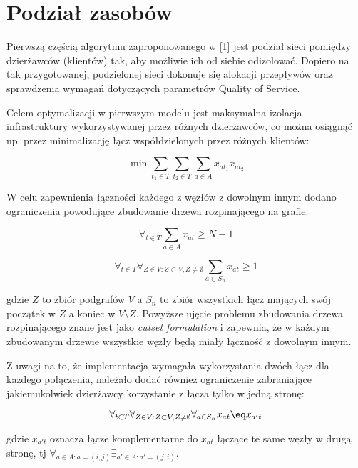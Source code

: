 \section{Podział zasobów}

Pierwszą częścią algorytmu zaproponowanego w [1] jest podział sieci pomiędzy dzierżawców (klientów) tak, aby możliwie ich od siebie odizolować. Dopiero na tak przygotowanej, podzielonej sieci dokonuje się alokacji przepływów oraz sprawdzenia wymagań dotyczących parametrów Quality of Service. \newline

Celem optymalizacji w pierwszym modelu jest maksymalna izolacja infrastruktury wykorzystywanej przez różnych dzierżawców, co można osiągnąć np. przez minimalizację łącz współdzielonych przez różnych klientów:

\begin{equation}
  \min \sum_{t_{1} \in T} \sum_{t_{2} \in T} \sum_{a \in A} x_{at_{1}} x_{at_{2}}
\end{equation}

W celu zapewnienia łączności każdego z węzłów z dowolnym innym dodano ograniczenia powodujące zbudowanie drzewa rozpinającego na grafie:

\begin{equation}
  \forall_{t \in T} \sum_{a \in A} x_{at} \ge N-1
\end{equation}

\begin{equation}
  \forall_{t \in T} \forall_{Z \in V: Z \subset V, Z \neq \emptyset } \sum_{a \in S_{n}} x_{at} \ge 1
\end{equation}

gdzie $Z$ to zbiór podgrafów $V$ a $S_{n}$ to zbiór wszystkich łącz mających swój początek w $Z$ a koniec w $V \setminus Z$. Powyższe ujęcie problemu zbudowania drzewa rozpinającego znane jest jako \textit{cutset formulation} i zapewnia, że w każdym zbudowanym drzewie wszystkie węzły będą miały łączność z dowolnym innym.

Z uwagi na to, że implementacja wymagała wykorzystania dwóch łącz dla każdego połączenia, należało dodać również ograniczenie zabraniające jakiemukolwiek dzierżawcy korzystanie z łącza tylko w jedną stronę:

\begin{equation}
  \forall_{t \in T} \forall_{Z \in V: Z \subset V, Z \neq \emptyset } \forall_{a \in S_{n}} x_{at} \eq x_{a't}
\end{equation}

gdzie $x_{a't}$ oznacza łącze komplementarne do $x_{at}$ łączące te same węzły w drugą stronę, tj $\forall_{a \in A: a = (i,j)} \exists_{a' \in A: a' = (j,i)}$.
